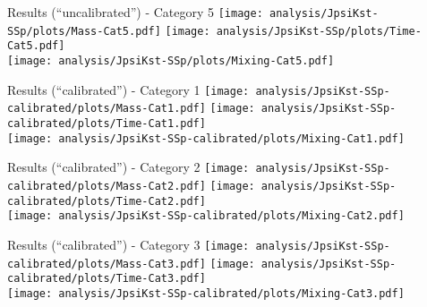 \begin{frame}[plain]{Results (\enquote{uncalibrated}) - Category 5}
  \centering
  \texttt{[image: analysis/JpsiKst-SSp/plots/Mass-Cat5.pdf]}
  \texttt{[image: analysis/JpsiKst-SSp/plots/Time-Cat5.pdf]} \\
  \texttt{[image: analysis/JpsiKst-SSp/plots/Mixing-Cat5.pdf]}
\end{frame}

\begin{frame}[plain]{Results (\enquote{calibrated}) - Category 1}
  \centering
  \texttt{[image: analysis/JpsiKst-SSp-calibrated/plots/Mass-Cat1.pdf]}
  \texttt{[image: analysis/JpsiKst-SSp-calibrated/plots/Time-Cat1.pdf]} \\
  \texttt{[image: analysis/JpsiKst-SSp-calibrated/plots/Mixing-Cat1.pdf]}
\end{frame}

\begin{frame}[plain]{Results (\enquote{calibrated}) - Category 2}
  \centering
  \texttt{[image: analysis/JpsiKst-SSp-calibrated/plots/Mass-Cat2.pdf]}
  \texttt{[image: analysis/JpsiKst-SSp-calibrated/plots/Time-Cat2.pdf]} \\
  \texttt{[image: analysis/JpsiKst-SSp-calibrated/plots/Mixing-Cat2.pdf]}
\end{frame}

\begin{frame}[plain]{Results (\enquote{calibrated}) - Category 3}
  \centering
  \texttt{[image: analysis/JpsiKst-SSp-calibrated/plots/Mass-Cat3.pdf]}
  \texttt{[image: analysis/JpsiKst-SSp-calibrated/plots/Time-Cat3.pdf]} \\
  \texttt{[image: analysis/JpsiKst-SSp-calibrated/plots/Mixing-Cat3.pdf]}
\end{frame}

